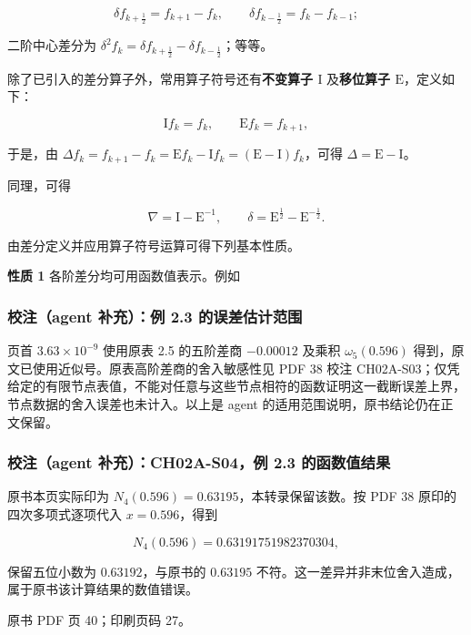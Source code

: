 \[
\delta f_{k+\frac12}=f_{k+1}-f_k,\qquad
\delta f_{k-\frac12}=f_k-f_{k-1};
\]

二阶中心差分为 \(\delta^2 f_k=\delta f_{k+\frac12}-\delta f_{k-\frac12}\)；等等。

除了已引入的差分算子外，常用算子符号还有\textbf{不变算子 \(\mathrm{I}\)} 及\textbf{移位算子 \(\mathrm{E}\)}，定义如下：

\[
\mathrm{I}f_k=f_k,\qquad\mathrm{E}f_k=f_{k+1},
\]

于是，由 \(\Delta f_k=f_{k+1}-f_k=\mathrm{E}f_k-\mathrm{I}f_k=(\mathrm{E}-\mathrm{I})f_k\)，可得 \(\Delta=\mathrm{E}-\mathrm{I}\)。

同理，可得

\[
\nabla=\mathrm{I}-\mathrm{E}^{-1},\qquad
\delta=\mathrm{E}^{\frac12}-\mathrm{E}^{-\frac12}.
\]

由差分定义并应用算子符号运算可得下列基本性质。

\textbf{性质 1} 各阶差分均可用函数值表示。例如

\subsubsection{校注（agent 补充）：例 2.3 的误差估计范围}\label{ch02a-ux6821ux6ce8agent-ux8865ux5145ux4f8b-2.3-ux7684ux8befux5deeux4f30ux8ba1ux8303ux56f4}

页首 \(3.63\times10^{-9}\) 使用原表 2.5 的五阶差商 \(-0.00012\) 及乘积 \(\omega_5(0.596)\) 得到，原文已使用近似号。原表高阶差商的舍入敏感性见 PDF 38 校注 CH02A-S03；仅凭给定的有限节点表值，不能对任意与这些节点相符的函数证明这一截断误差上界，节点数据的舍入误差也未计入。以上是 agent 的适用范围说明，原书结论仍在正文保留。

\subsubsection{校注（agent 补充）：CH02A-S04，例 2.3 的函数值结果}\label{ch02a-ux6821ux6ce8agent-ux8865ux5145ch02a-s04ux4f8b-2.3-ux7684ux51fdux6570ux503cux7ed3ux679c}

原书本页实际印为 \(N_4(0.596)=0.63195\)，本转录保留该数。按 PDF 38 原印的四次多项式逐项代入 \(x=0.596\)，得到

\[
N_4(0.596)=0.63191751982370304,
\]

保留五位小数为 \(0.63192\)，与原书的 \(0.63195\) 不符。这一差异并非末位舍入造成，属于原书该计算结果的数值错误。

\clearpage

原书 PDF 页 40；印刷页码 27。

